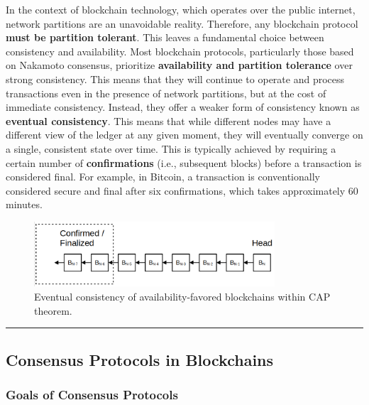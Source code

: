 In the context of blockchain technology, which operates over the public
internet, network partitions are an unavoidable reality. Therefore, any
blockchain protocol \textbf{must be partition tolerant}. This leaves a
fundamental choice between consistency and availability.
%
Most blockchain protocols, particularly those based on Nakamoto
consensus, prioritize \textbf{availability and partition tolerance} over
strong consistency. This means that they will continue to operate and
process transactions even in the presence of network partitions, but at
the cost of immediate consistency. Instead, they offer a weaker form of
consistency known as \textbf{eventual consistency}. This means that
while different nodes may have a different view of the ledger at any
given moment, they will eventually converge on a single, consistent
state over time. This is typically achieved by requiring a certain
number of \textbf{confirmations} (i.e., subsequent blocks) before a
transaction is considered final. For example, in Bitcoin, a transaction
is conventionally considered secure and final after six confirmations,
which takes approximately 60 minutes.

\begin{figure}[t]
	\begin{center}
		\includegraphics[width=0.8\textwidth]{./figs/btc-finality.png} 
		\caption{Eventual consistency of availability-favored blockchains within CAP theorem.}		
		\label{fig:btc-finality}
	\end{center}	
\end{figure}

\begin{center}\rule{0.5\linewidth}{0.5pt}\end{center}

\subsection{Consensus Protocols in
	Blockchains}\label{section-2-consensus-protocols-in-blockchains}

\subsubsection{Goals of Consensus
	Protocols}\label{goals-of-consensus-protocols}


